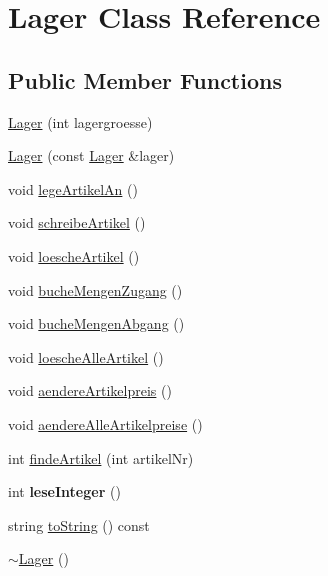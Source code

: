 \hypertarget{class_lager}{\section{Lager Class Reference}
\label{class_lager}
}
\subsection*{Public Member Functions}
\begin{DoxyCompactItemize}
\item 
\hyperlink{class_lager_af04e930ca76d1b7dc20c9940a4e57ce3}{Lager} (int lagergroesse)
\item 
\hyperlink{class_lager_a81c6f2db2ceff57a7b4977831a7fccc2}{Lager} (const \hyperlink{class_lager}{Lager} \&lager)
\item 
void \hyperlink{class_lager_a65d02bf1f5e6eb998746def6f142bc3c}{lege\-Artikel\-An} ()
\item 
void \hyperlink{class_lager_aa2a6c4c79d96ea19fe235c03ef4ab826}{schreibe\-Artikel} ()
\item 
void \hyperlink{class_lager_a267859c5ea231924df84d7ddfd8c9105}{loesche\-Artikel} ()
\item 
void \hyperlink{class_lager_a90919392e50bd2922e815c7a9206d106}{buche\-Mengen\-Zugang} ()
\item 
void \hyperlink{class_lager_ae3796fa5f09f20e9dc46a21ecd31ea22}{buche\-Mengen\-Abgang} ()
\item 
void \hyperlink{class_lager_a9b126247869a252e37add5bd191285cb}{loesche\-Alle\-Artikel} ()
\item 
void \hyperlink{class_lager_adc6b9cfac09c007332e9b6412a1583bf}{aendere\-Artikelpreis} ()
\item 
void \hyperlink{class_lager_ab5757fff4d06cbf8d1c78a060b17d0c4}{aendere\-Alle\-Artikelpreise} ()
\item 
int \hyperlink{class_lager_a0c332901288b04af2017df38418b731b}{finde\-Artikel} (int artikel\-Nr)
\item 
\hypertarget{class_lager_af6169e935bcfdf75067c09e58cf97df6}{int {\bfseries lese\-Integer} ()}\label{class_lager_af6169e935bcfdf75067c09e58cf97df6}

\item 
string \hyperlink{class_lager_aac7c271fbb0f38f847957d42c32d7138}{to\-String} () const 
\item 
\hyperlink{class_lager_a5658fc72ef02a9531bc3bbf96c49d3ae}{$\sim$\-Lager} ()
\end{DoxyCompactItemize}


